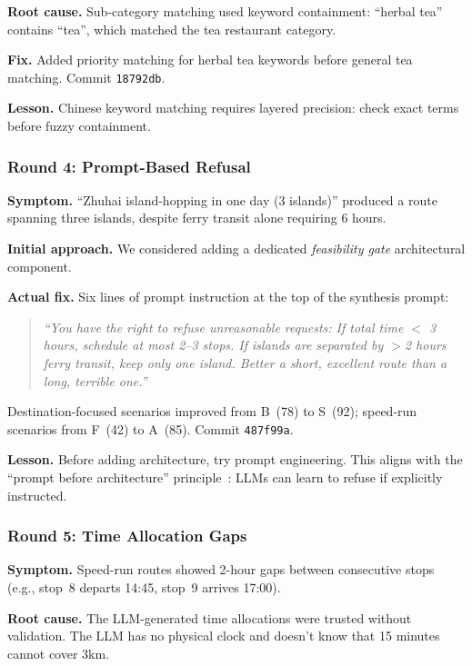 \textbf{Root cause.} Sub-category matching used keyword containment: ``herbal tea'' contains ``tea'', which matched the tea restaurant category.

\textbf{Fix.} Added priority matching for herbal tea keywords before general tea matching. Commit \texttt{18792db}.

\textbf{Lesson.} Chinese keyword matching requires layered precision: check exact terms before fuzzy containment.

\subsubsection{Round 4: Prompt-Based Refusal}

\textbf{Symptom.} ``Zhuhai island-hopping in one day (3 islands)'' produced a route spanning three islands, despite ferry transit alone requiring 6 hours.

\textbf{Initial approach.} We considered adding a dedicated \textit{feasibility gate} architectural component.

\textbf{Actual fix.} Six lines of prompt instruction at the top of the synthesis prompt:

\begin{quote}
\textit{``You have the right to refuse unreasonable requests: If total time $<$ 3 hours, schedule at most 2--3 stops. If islands are separated by $>$2 hours ferry transit, keep only one island. Better a short, excellent route than a long, terrible one.''}
\end{quote}

Destination-focused scenarios improved from B~(78) to S~(92); speed-run scenarios from F~(42) to A~(85). Commit \texttt{487f99a}.

\textbf{Lesson.} Before adding architecture, try prompt engineering. This aligns with the ``prompt before architecture'' principle~\cite{white2024prompt}: LLMs can learn to refuse if explicitly instructed.

\subsubsection{Round 5: Time Allocation Gaps}

\textbf{Symptom.} Speed-run routes showed 2-hour gaps between consecutive stops (e.g., stop~8 departs 14:45, stop~9 arrives 17:00).

\textbf{Root cause.} The LLM-generated time allocations were trusted without validation. The LLM has no physical clock and doesn't know that 15 minutes cannot cover 3km.

